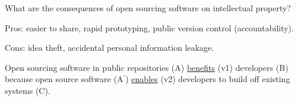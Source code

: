 \documentclass[12pt]{article}
\begin{document}
What are the consequences of open sourcing software on intellectual property?

Pros: easier to share, rapid prototyping, public version control (accountability).

Cons: idea theft, accidental personal information leakage.

Open sourcing software in public repositories (A) \uline{benefits} (v1) developers (B) because open source software (A$^\prime$) \uline{enables} (v2) developers to build off existing systems (C).

\end{document}
